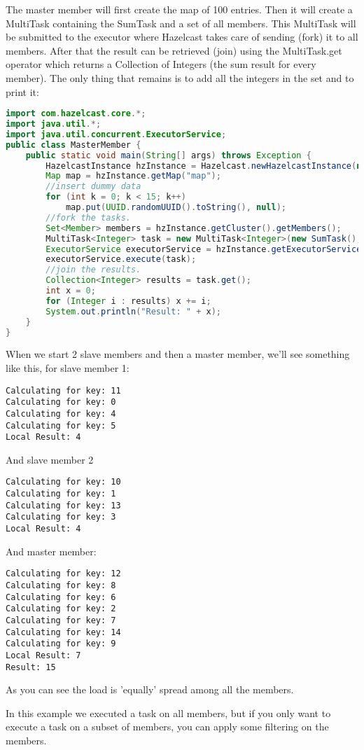 The master member will first create the map of 100 entries. Then it will create a MultiTask containing the SumTask and a set of all members. This MultiTask will be submitted to the executor where Hazelcast takes care of sending (fork) it to all members. After that the result can be retrieved (join) using the MultiTask.get operator which returns a Collection of Integers (the sum result for every member). The only thing that remains is to add all the integers in the set and to print it:
\begin{lstlisting}[language=java]
import com.hazelcast.core.*;
import java.util.*;
import java.util.concurrent.ExecutorService;
public class MasterMember {
    public static void main(String[] args) throws Exception {
        HazelcastInstance hzInstance = Hazelcast.newHazelcastInstance(null);
        Map map = hzInstance.getMap("map");
        //insert dummy data
        for (int k = 0; k < 15; k++)
            map.put(UUID.randomUUID().toString(), null);
        //fork the tasks.
        Set<Member> members = hzInstance.getCluster().getMembers();
        MultiTask<Integer> task = new MultiTask<Integer>(new SumTask(), members);
        ExecutorService executorService = hzInstance.getExecutorService();
        executorService.execute(task);
        //join the results.
        Collection<Integer> results = task.get();
        int x = 0;
        for (Integer i : results) x += i;
        System.out.println("Result: " + x);
    }
}
\end{lstlisting}
When we start 2 slave members and then a master member, we'll see something like this, for slave member 1:
\begin{lstlisting}
Calculating for key: 11
Calculating for key: 0
Calculating for key: 4
Calculating for key: 5
Local Result: 4
\end{lstlisting}
And slave member 2
\begin{lstlisting}
Calculating for key: 10
Calculating for key: 1
Calculating for key: 13
Calculating for key: 3
Local Result: 4
\end{lstlisting}
And master member:
\begin{lstlisting}
Calculating for key: 12
Calculating for key: 8
Calculating for key: 6
Calculating for key: 2
Calculating for key: 7
Calculating for key: 14
Calculating for key: 9
Local Result: 7
Result: 15
\end{lstlisting}
As you can see the load is 'equally' spread among all the members. 

In this example we executed a task on all members, but if you only want to execute a task on a subset of members, you can apply some filtering on the members. 

